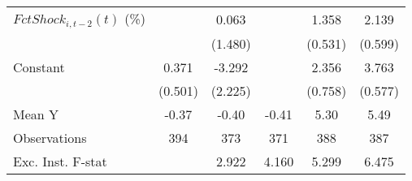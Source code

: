 {\begin{tabular}{l*{5}{c}}
\addlinespace
$ FctShock_{i,t-2}(t)$ (\%)&                     &       0.063         &                     &       1.358\sym{**} &       2.139\sym{***}\\
                    &                     &     (1.480)         &                     &     (0.531)         &     (0.599)         \\
\addlinespace
Constant            &       0.371         &      -3.292         &                     &       2.356\sym{***}&       3.763\sym{***}\\
                    &     (0.501)         &     (2.225)         &                     &     (0.758)         &     (0.577)         \\
\midrule
Mean Y              &       -0.37         &       -0.40         &       -0.41         &        5.30         &        5.49         \\
Observations        &         394         &         373         &         371         &         388         &         387         \\
Exc. Inst. F-stat   &                     &       2.922         &       4.160         &       5.299         &       6.475         \\
\bottomrule
\end{tabular}
}

